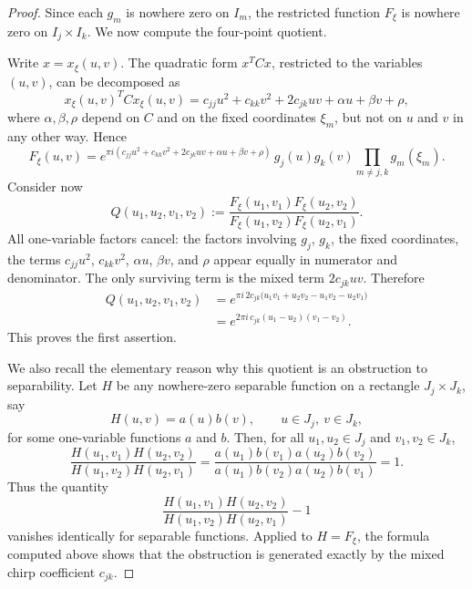 \documentclass[10pt,a4paper]{amsart}
\begin{document}
\begin{proof}
{Since each $g_m$ is nowhere zero on $I_m$, the restricted function
$F_\xi$ is nowhere zero on $I_j\times I_k$. We now compute the four-point quotient.}

{Write $x=x_\xi(u,v)$. The quadratic form $x^TCx$, restricted to the variables
$(u,v)$, can be decomposed as
$$
x_\xi(u,v)^T C x_\xi(u,v)
=
c_{jj}u^2+c_{kk}v^2+2c_{jk}uv+\alpha u+\beta v+\rho,
$$
where $\alpha,\beta,\rho$ depend on $C$ and on the fixed coordinates
$\xi_m$, but not on $u$ and $v$ in any other way. Hence
$$
F_\xi(u,v)
=
e^{\pi i(c_{jj}u^2+c_{kk}v^2+2c_{jk}uv+\alpha u+\beta v+\rho)}
\,g_j(u)g_k(v)
\prod_{m\neq j,k}g_m(\xi_m).
$$
Consider now
$$
Q(u_1,u_2,v_1,v_2)
:=
\frac{
F_\xi(u_1,v_1)F_\xi(u_2,v_2)
}{
F_\xi(u_1,v_2)F_\xi(u_2,v_1)
}.
$$
All one-variable factors cancel:
the factors involving $g_j$, $g_k$, the fixed coordinates, the terms
$c_{jj}u^2$, $c_{kk}v^2$, $\alpha u$, $\beta v$, and $\rho$
appear equally in numerator and denominator. The only surviving term is the mixed
term $2c_{jk}uv$. Therefore
$$
\begin{aligned}
Q(u_1,u_2,v_1,v_2)
&=
e^{
\pi i\,2c_{jk}
\big(
u_1v_1+u_2v_2-u_1v_2-u_2v_1
\big)
}\\
&=
e^{
2\pi i\,c_{jk}(u_1-u_2)(v_1-v_2)
}.
\end{aligned}
$$
This proves the first assertion.}

{We also recall the elementary reason why this quotient is an obstruction to
separability. Let $H$ be any nowhere-zero separable function on a rectangle
$J_j\times J_k$, say
$$
H(u,v)=a(u)b(v),
\qquad u\in J_j,\ v\in J_k,
$$
for some one-variable functions $a$ and $b$. Then, for all
$u_1,u_2\in J_j$ and $v_1,v_2\in J_k$,
$$
\frac{
H(u_1,v_1)H(u_2,v_2)
}{
H(u_1,v_2)H(u_2,v_1)
}
=
\frac{
a(u_1)b(v_1)a(u_2)b(v_2)
}{
a(u_1)b(v_2)a(u_2)b(v_1)
}
=
1.
$$
Thus the quantity
$$
\frac{
H(u_1,v_1)H(u_2,v_2)
}{
H(u_1,v_2)H(u_2,v_1)
}
-1
$$
vanishes identically for separable functions. Applied to $H=F_\xi$, the formula
computed above shows that the obstruction is generated exactly by the mixed chirp
coefficient $c_{jk}$.}


\end{proof}
\end{document}
